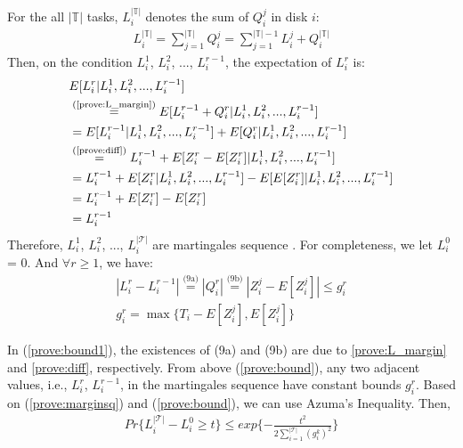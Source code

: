 \documentclass[conference]{IEEEtran}
\begin{document}
For the all $\mathbb{|T|}$ tasks, $L_i^{\mathbb{|T|}}$ denotes the sum of $Q_i^j$ in disk $i$:
\begin{align}
L_i^{\mathbb{|T|}} = \sum_{j = 1}^{\mathbb{|T|}} Q_i^j
= \sum_{j = 1}^{\mathbb{|T|} - 1} L_i^j + Q_i^{\mathbb{|T|}} \label{prove:L_margin}
\end{align}
Then, on the condition $L_i^{1}$, $L_i^{2}$, ..., $L_i^{r-1}$, the expectation of $L_i^{r}$ is:
\begin{align}
&E[L_i^{r}|L_i^{1}, L_i^{2}, ..., L_i^{r-1}] \nonumber\\
&\overset{\text{(\ref{prove:L_margin})}}{=}E[L_i^{r-1} + Q_i^{r} |L_i^{1}, L_i^{2}, ..., L_i^{r-1}] \nonumber\\
&\overset{\text{}}{=}E[L_i^{r-1} |L_i^{1}, L_i^{2}, ..., L_i^{r-1}]
+ E[Q_i^{r} |L_i^{1}, L_i^{2}, ..., L_i^{r-1}] \nonumber\\
&\overset{\text{(\ref{prove:diff})}}{=}L_i^{r-1} + E[Z_i^r - E[Z_i^r] |L_i^{1}, L_i^{2}, ..., L_i^{r-1}]\nonumber\\
&=L_i^{r-1} + E[Z_i^r|L_i^{1}, L_i^{2}, ..., L_i^{r-1}]
-E[E[Z_i^r] |L_i^{1}, L_i^{2}, ..., L_i^{r-1}]\nonumber\\
&=L_i^{r-1} + E[Z_i^r] - E[Z_i^r]\nonumber\\
&=L_i^{r-1}\label{prove:marginsq}
\end{align}
Therefore, $L_i^{1}$, $L_i^{2}$, ..., $L_i^{|\mathcal{T}|}$ are martingales sequence \cite{b13}. For completeness, we let $L_i^{0}$ = 0. And $\forall r \geq 1$, we have:
\begin{align}
  |L_i^r - L_i^{r-1}|\overset{\text{(9a)}}{=} |Q_i^{r}| \overset{\text{(9b)}}{=} |Z_i^j - E[Z_i^j]|\leq g_i^r\label{prove:bound1}\\
  g_i^r = \max\{T_i -  E[Z_i^j], E[Z_i^j]\}\label{prove:bound}
\end{align}

In (\ref{prove:bound1}), the existences of (9a) and (9b) are due to \ref{prove:L_margin} and \ref{prove:diff}, respectively. From above (\ref{prove:bound}), any two adjacent values, i.e., $L_i^r$, $L_i^{r-1}$, in the martingales sequence have constant bounds $g_i^r$. Based on (\ref{prove:marginsq}) and (\ref{prove:bound}), we can use Azuma's Inequality. Then, 
\begin{align}
Pr\{L_i^{|\mathcal{T}|} - L_i^{0} \geq t\} \leq exp\{-\frac{t^2}{2\sum_{ i = 1 }^{|\mathcal{T}|}(g_i^k)^2}\} \label{prove:azuma}
\end{align}
\end{document}
